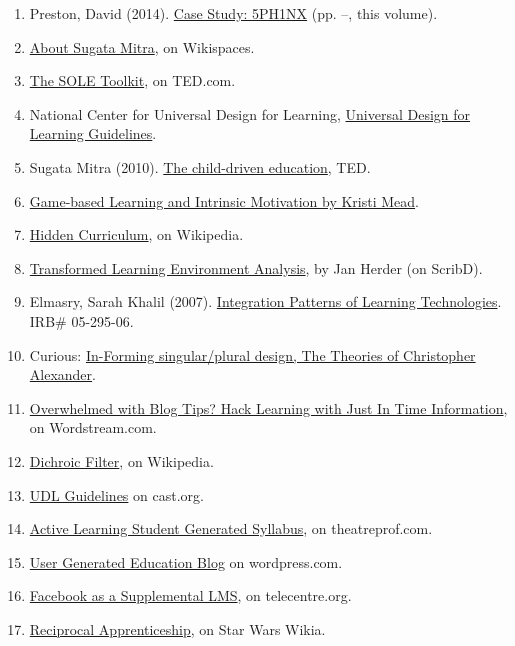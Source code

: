 \begin{enumerate}
\def\labelenumi{\arabic{enumi}.}
\item
  Preston, David (2014).
  \href{http://peeragogy.org/case-study-5ph1nx/}{Case Study: 5PH1NX}
  (pp. --, this volume).
\item
  \href{http://sugatam.wikispaces.com/}{About Sugata Mitra}, on
  Wikispaces.
\item
  \href{http://www.ted.com/pages/sole_toolkit}{The SOLE Toolkit}, on
  TED.com.
\item
  National Center for Universal Design for Learning,
  \href{http://www.udlcenter.org/aboutudl/udlguidelines}{Universal
  Design for Learning Guidelines}.
\item
  Sugata Mitra (2010).
  \href{http://www.ted.com/talks/sugata_mitra_the_child_driven_education.html}{The
  child-driven education}, TED.
\item
  \href{http://www.academia.edu/1137269/Game-based_Learning_and_Intrinsic_Motivation}{Game-based
  Learning and Intrinsic Motivation by Kristi Mead}.
\item
  \href{http://en.wikipedia.org/wiki/Hidden_curriculum}{Hidden
  Curriculum}, on Wikipedia.
\item
  \href{http://www.scribd.com/doc/181089012/Transformed-Learning-Environment-Analysis}{Transformed
  Learning Environment Analysis}, by Jan Herder (on ScribD).
\item
  Elmasry, Sarah Khalil (2007).
  \href{http://scholar.lib.vt.edu/theses/available/etd-09232007-220306/unrestricted/SElmasryETDbodytext.pdf}{Integration
  Patterns of Learning Technologies}. IRB\# 05-295-06.
\item
  Curious:
  \href{http://nourdiab.wordpress.com/2011/02/23/the-theories-of-christopher-alexander/}{In-Forming
  singular/plural design, The Theories of Christopher Alexander}.
\item
  \href{http://www.wordstream.com/blog/ws/2013/10/02/just-in-time-information-hacks}{Overwhelmed
  with Blog Tips? Hack Learning with Just In Time Information}, on
  Wordstream.com.
\item
  \href{http://en.wikipedia.org/wiki/Dichroic_filter}{Dichroic Filter},
  on Wikipedia.
\item
  \href{http://www.cast.org/library/UDLguidelines/}{UDL Guidelines} on
  cast.org.
\item
  \href{http://www.theatreprof.com/2011/active-learning-student-generated-syllabus/}{Active
  Learning Student Generated Syllabus}, on theatreprof.com.
\item
  \href{http://usergeneratededucation.wordpress.com/}{User Generated
  Education Blog} on wordpress.com.
\item
  \href{http://community.telecentre.org/profiles/blogs/facebook-as-a-supplemental-lms}{Facebook
  as a Supplemental LMS}, on telecentre.org.
\item
  \href{http://starwars.wikia.com/wiki/Reciprocal_apprenticeship}{Reciprocal
  Apprenticeship}, on Star Wars Wikia.
\end{enumerate}

